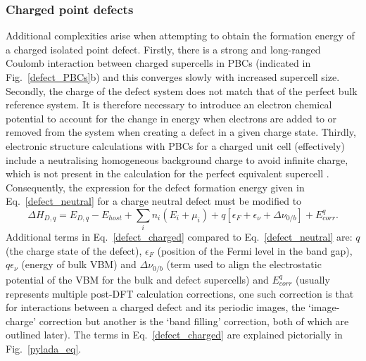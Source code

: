 \documentclass[11pt, twoside]{report}
\begin{document}
\subsubsection{Charged point defects}
Additional complexities arise when attempting to obtain the formation energy of a charged isolated point defect. Firstly, there is a strong and long-ranged Coulomb interaction between charged supercells in PBCs (indicated in Fig.~\ref{defect_PBCs}b) and this converges slowly with increased supercell size.
Secondly, the charge of the defect system does not match that of the perfect bulk reference system. It is therefore necessary to introduce an electron chemical potential to account for the change in energy when electrons are added to or removed from the system when creating a defect in a given charge state.
Thirdly, electronic structure calculations with PBCs for a charged unit cell (effectively) include a neutralising homogeneous background charge to avoid infinite charge, which is not present in the calculation for the perfect equivalent supercell \cite{freysoldt_rev}. Consequently, the expression for the defect formation energy given in Eq.~\ref{defect_neutral} for a charge neutral defect must be modified to 
\begin{equation}\label{defect_charged}
\Delta H_{D,q} = E_{D,q} - E_{host} + \sum_i n_i (E_i + \mu_i) + q[\epsilon_F + \epsilon_{\nu} + \Delta \nu_{0/b}] + E^q_{corr}.
\end{equation}
Additional terms in Eq.~\ref{defect_charged} compared to Eq.~\ref{defect_neutral} are: $q$ (the charge state of the defect), $\epsilon_F$ (position of the Fermi level in the band gap),  $q \epsilon_{\nu}$ (energy of bulk VBM) and $\Delta \nu_{0/b}$ (term used to align the electrostatic potential of the VBM for the bulk and defect supercells) and $E^q_{corr}$ (usually represents multiple post-DFT calculation corrections, one such correction is that for interactions between a charged defect and its periodic images, the `image-charge' correction but another is the `band filling' correction, both of which are outlined later). 
The terms in Eq.~\ref{defect_charged} are explained pictorially in Fig.~\ref{pylada_eq}.
\end{document}
